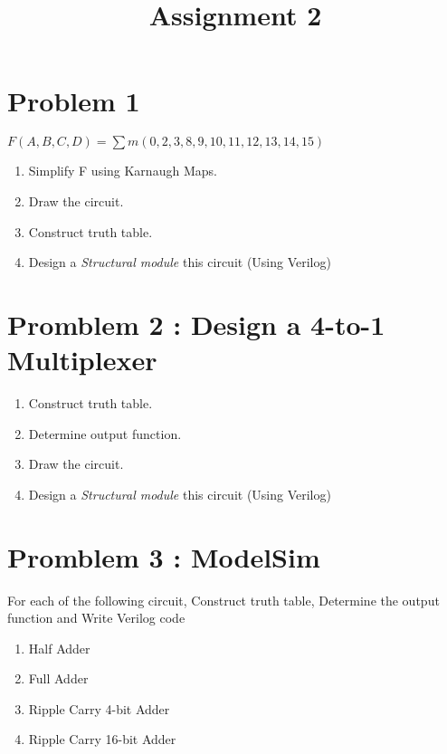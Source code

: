 \documentclass[12pt, letterpaper]{article}
\title{Assignment 2}
\author{}
\date{}
\begin{document}
\maketitle

\section*{Problem 1}
$F(A,B,C,D)=\sum m(0,2,3,8,9,10,11,12,13,14,15)$
\begin{enumerate}
    \item Simplify F using Karnaugh Maps.
    \item Draw the circuit.
    \item Construct truth table.
    \item Design a \emph{Structural module} this circuit (Using Verilog)
\end{enumerate}

\section*{Promblem 2 : Design a 4-to-1 Multiplexer }

\begin{enumerate}
    \item Construct truth table.
    \item Determine output function.
    \item Draw the circuit.
    \item Design a \emph{Structural module} this circuit (Using Verilog)
\end{enumerate}

\pagebreak
\section*{Promblem 3 : ModelSim}

For each of the following circuit, Construct truth table, Determine the output function and Write Verilog code 

\begin{enumerate}
    \item Half Adder
    \item Full Adder
    \item Ripple Carry 4-bit Adder
    \item Ripple Carry 16-bit Adder
\end{enumerate}
\end{document}
